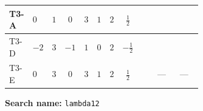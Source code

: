 \documentclass[8pt]{article}
\begin{document}
\begin{landscape}
\begin{longtable}{@{}llcccccc >{\raggedright\arraybackslash}p{0.21\linewidth} >{\raggedright\arraybackslash}p{0.21\linewidth} >{\raggedright\arraybackslash}p{0.21\linewidth}@{}}
\midrule
T3-A & $0$ & $1$ & $0$ & $3$ & $1$ & $2$ & $\frac{1}{2}$ & \scriptsize\adjustbox{max width=\linewidth}{$\begin{gathered} +4 {\lambda_{12}}^2\end{gathered}$} & \scriptsize\adjustbox{max width=\linewidth}{$\begin{gathered} +4 {\lambda_{12}} {\lambda_{S_1}}\end{gathered}$} & \scriptsize\adjustbox{max width=\linewidth}{$\begin{gathered} +8 {\lambda_{12}} {\lambda_{S_2}}\end{gathered}$} \\
\midrule
T3-D & $-2$ & $3$ & $-1$ & $1$ & $0$ & $2$ & $-\frac{1}{2}$ & \scriptsize\adjustbox{max width=\linewidth}{$\begin{gathered} +4 {\lambda_{12}}^2\end{gathered}$} & \scriptsize\adjustbox{max width=\linewidth}{$\begin{gathered} +8 {\lambda_{12}} {\lambda_{S_1}}\end{gathered}$} & \scriptsize\adjustbox{max width=\linewidth}{$\begin{gathered} +4 {\lambda_{12}} {\lambda_{S_2}}\end{gathered}$} \\
\midrule
T3-E & $0$ & $3$ & $0$ & $3$ & $1$ & $2$ & $\frac{1}{2}$ & \scriptsize\adjustbox{max width=\linewidth}{$\begin{gathered} +4 {\lambda_{12}}^2\end{gathered}$} & --- & --- \\
\midrule
\bottomrule
\end{longtable}
\clearpage
\noindent\textbf{Search name: }\texttt{lambda12}\par\smallskip

\end{landscape}
\end{document}
